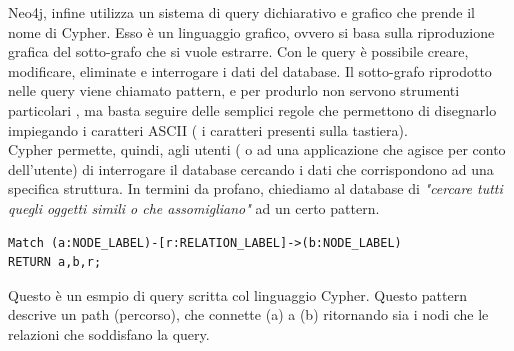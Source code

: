 Neo4j, infine utilizza un sistema di query dichiarativo e grafico che prende il nome di Cypher. Esso è un linguaggio grafico, ovvero si basa sulla riproduzione grafica del sotto-grafo che si vuole estrarre. Con le query è possibile creare, modificare, eliminate e interrogare i dati del database. Il sotto-grafo riprodotto nelle query viene chiamato pattern, e per produrlo non servono strumenti particolari , ma basta seguire delle semplici regole che permettono di disegnarlo impiegando i caratteri ASCII ( i caratteri presenti sulla tastiera).
\\Cypher permette, quindi, agli utenti ( o ad una applicazione che agisce per conto dell'utente) di interrogare il database cercando i dati che corrispondono ad una specifica struttura. In termini da profano, chiediamo al database di \textit{"cercare tutti quegli oggetti simili o che assomigliano"} ad un certo pattern.
\begin{lstlisting}[language=Cypher, label=lst:CypherQuery, caption={Query Cypher.}]
Match (a:NODE_LABEL)-[r:RELATION_LABEL]->(b:NODE_LABEL) 
RETURN a,b,r;
\end{lstlisting}
Questo è un esmpio di query scritta col linguaggio Cypher. Questo pattern descrive un path (percorso), che connette (a) a (b) ritornando sia i nodi che le relazioni che soddisfano la query.